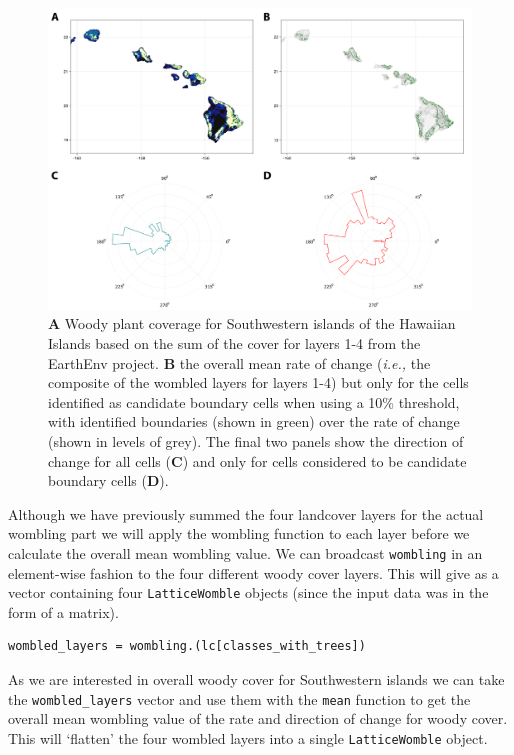 \begin{refsection}
\begin{figure}[h]
    \centering
    \includegraphics[width=\textwidth]{figures/fig_eg.png}
    \caption{\textbf{A} Woody plant coverage for Southwestern islands of the
Hawaiian Islands based on the sum of the cover for layers 1-4 from the
EarthEnv project. \textbf{B} the overall mean rate of change
(\emph{i.e.,} the composite of the wombled layers for layers 1-4) but
only for the cells identified as candidate boundary cells when using a
10\% threshold, with identified boundaries (shown in green) over the
rate of change (shown in levels of grey). The final two panels show the
direction of change for all cells (\textbf{C}) and only for cells
considered to be candidate boundary cells
(\textbf{D}).}
    \label{fig:example_womble}
\end{figure}

Although we have previously summed the four landcover layers for the
actual wombling part we will apply the wombling function to each layer
before we calculate the overall mean wombling value. We can broadcast
\texttt{wombling} in an element-wise fashion to the four different woody
cover layers. This will give as a vector containing four
\texttt{LatticeWomble} objects (since the input data was in the form of
a matrix).

\begin{verbatim}
wombled_layers = wombling.(lc[classes_with_trees])
\end{verbatim}

As we are interested in overall woody cover for Southwestern islands we
can take the \texttt{wombled\_layers} vector and use them with the
\texttt{mean} function to get the overall mean wombling value of the
rate and direction of change for woody cover. This will `flatten' the
four wombled layers into a single \texttt{LatticeWomble} object.


\end{refsection}
